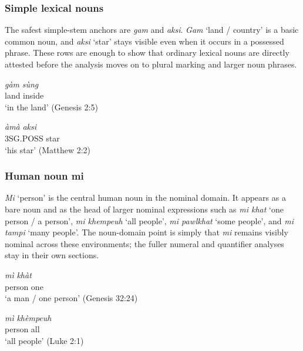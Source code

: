 \documentclass[
  11pt,
  a4paper,
]{article}
\newcommand{\tdim}[1]{\textit{#1}}
\newcommand{\tdimword}[1]{\textit{#1}}
\renewcommand{\textsc}[1]{{\footnotesize\MakeUppercase{#1}}}
\newcommand{\glossquote}[1]{`#1'}
\begin{document}
\subsubsection{Simple lexical nouns}\label{simple-lexical-nouns}

The safest simple-stem anchors are \tdim{gam} and \tdim{aksi}.
\tdim{Gam} \glossquote{land / country} is a basic common noun, and
\tdim{aksi} \glossquote{star} stays visible even when it occurs in a
possessed phrase. These rows are enough to show that ordinary lexical
nouns are directly attested before the analysis moves on to plural
marking and larger noun phrases.

\begin{exe}
\ex \label{ex:noun-gam}
\gll \tdimword{gàm} \tdimword{sùng} \\
     land inside \\
\glt \glossquote{in the land} (Genesis 2:5)
\end{exe}

\begin{exe}
\ex \label{ex:noun-aksi}
\gll \tdimword{àmà} \tdimword{aksi} \\
     \textsc{3sg}.\textsc{poss} star \\
\glt \glossquote{his star} (Matthew 2:2)
\end{exe}

\subsubsection{Human noun mi}\label{human-noun-mi}

\tdim{Mi} \glossquote{person} is the central human noun in the nominal
domain. It appears as a bare noun and as the head of larger nominal
expressions such as \tdim{mi khat} \glossquote{one person / a person},
\tdim{mi khempeuh} \glossquote{all people}, \tdim{mi pawlkhat}
\glossquote{some people}, and \tdim{mi tampi} \glossquote{many people}.
The noun-domain point is simply that \tdim{mi} remains visibly nominal
across these environments; the fuller numeral and quantifier analyses
stay in their own sections.

\begin{exe}
\ex \label{ex:noun-mi-khat}
\gll \tdimword{mì} \tdimword{khàt} \\
     person one \\
\glt \glossquote{a man / one person} (Genesis 32:24)
\end{exe}

\begin{exe}
\ex \label{ex:noun-mi-khempeuh}
\gll \tdimword{mì} \tdimword{khèmpeuh} \\
     person all \\
\glt \glossquote{all people} (Luke 2:1)
\end{exe}
\end{document}
